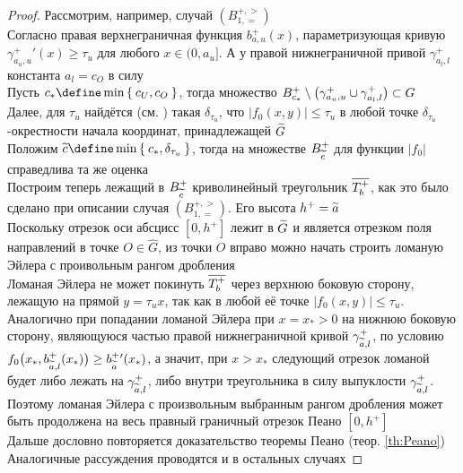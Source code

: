 \begin{proof}
    Рассмотрим, например, случай $ (B_{1, =}^{+, >}) $ \\
    Согласно   правая верхнеграничная функция $ b_{a, u}^+(x) $, параметризующая кривую $ \gamma_{a_u, u}^+{}'(x) \ge \tau_u $ для любого $ x \in (0, a_u] $. А у правой нижнеграничной привой $ \gamma_{a_l, l}^+ $ константа $ a_l = c_O $ в силу   \\
    Пусть $ c_* \define \min\set{c_U, c_O} $, тогда множество $ B_{c_*}^+ \setminus \big( \gamma_{a_u, u}^+ \cup \gamma_{a_l, l}^+ \big) \subset G $ \\
    Далее, для $ \tau_u $ найдётся (см. ) такая $ \delta_{\tau_u} $, что $ |f_0(x, y)| \le \tau_u $ в любой точке $ \delta_{\tau_u} $-окрестности начала координат, принадлежащей $ \widetilde{G} $ \\
    Положим $ \vawe{c} \define \min\set{c_*, \delta_{\tau_u}} $, тогда на множестве $ B_{\widetilde{c}}^+ $ для функции $ |f_0| $ справедлива та же оценка \\
    Построим теперь лежащий в $ B_{\widetilde{c}}^+ $ криволинейный треугольник $ \overline{T_b^+} $, как это было сделано при описании случая $ (B_{1, =}^{+, >}) $. Его высота $ h^+ = \widetilde{a} $ \\
    Поскольку отрезок оси абсцисс $ [0, h^+] $ лежит в $ \widetilde{G} $ и является отрезком поля направлений в точке $ O \in \hat{G} $, из точки $ O $ вправо можно начать строить ломаную Эйлера с проивольным рангом дробления \\
    Ломаная Эйлера не может покинуть $ \overline{T_b^+} $ через верхнюю боковую сторону, лежащую на прямой $ y = \tau_ux $, так как в любой её точке $ |f_0(x, y)| \le \tau_u $. Аналогично при попадании ломаной Эйлера при $ x = x_* > 0 $ на нижнюю боковую сторону, являющуюся частью правой нижнеграничной кривой $ \gamma_{\widetilde{a}, l}^+ $, по условию   $ f_0 \big( x_*, b_{\widetilde{a}, l}^+(x_*) \big) \ge b_{\widetilde{a}}^+{}'(x_*) $, а значит, при $ x > x_* $ следующий отрезок ломаной будет либо лежать на $ \gamma_{\widetilde{a}, l}^+ $, либо внутри треугольника в силу выпуклости $ \gamma_{\widetilde{a}, l}^+ $. Поэтому ломаная Эйлера с произвольным выбранным рангом дробления может быть продолжена на весь правный граничный отрезок Пеано $ [0, h^+] $ \\
    Дальше дословно повторяется доказательство теоремы Пеано (теор. \ref{th:Peano}) \\
    Аналогичные рассуждения проводятся и в остальных случаях
\end{proof}

